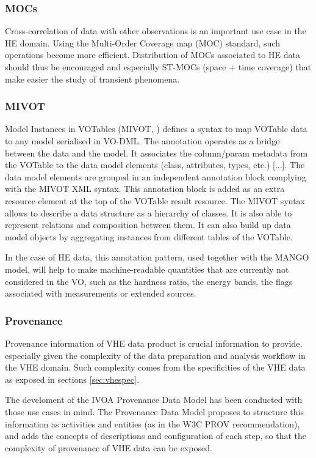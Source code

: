 \documentclass[11pt,a4paper]{ivoa}
\begin{document}
{\subsubsection{MOCs}

Cross-correlation of data with other observations is an important use case in the \gls{HE} domain. Using the Multi-Order Coverage map (MOC) standard, such operations become more efficient. Distribution of MOCs associated to \gls{HE} data should thus be encouraged and especially ST-MOCs (space + time coverage)
that make easier the study of transient phenomena.

\subsubsection{MIVOT}

Model Instances in VOTables (MIVOT, \citealt{2023ivoa.spec.0620M}) defines a syntax to map VOTable data to any model serialised in VO-DML.
The annotation operates as a bridge between the data and the model.
It associates the column/param metadata from the VOTable to the data model elements (class, attributes, types, etc.) [...].
The data model elements are grouped in an independent annotation block complying with the MIVOT XML syntax.
This annotation block is added as an extra resource element at the top of the VOTable result resource.
The MIVOT syntax allows to describe a data structure as a hierarchy of classes.
It is also able to represent relations and composition between them. It can also build up data model objects by aggregating instances from different tables of the VOTable.

In the case of \gls{HE} data, this annotation pattern, used together with the MANGO model, will help to make machine-readable quantities that are currently not considered in the \gls{VO},
such as the hardness ratio, the energy bands, the flags associated with measurements or  extended sources.


\subsubsection{Provenance}

Provenance information of \gls{VHE} data product is crucial information to provide, especially given the complexity of the data preparation and analysis workflow in the \gls{VHE} domain. Such complexity comes from the specificities of the \gls{VHE} data as exposed in sections \ref{sec:vhespec}.

The develoment of the \gls{IVOA} Provenance Data Model \citep{2020ivoa.spec.0411S} has been conducted with those use cases in mind. The Provenance Data Model proposes to structure this information as activities and entities (as in the W3C PROV recommendation), and adds the concepts of descriptions and configuration of each step, so that the complexity of provenance of \gls{VHE} data can be exposed.

}
\end{document}
